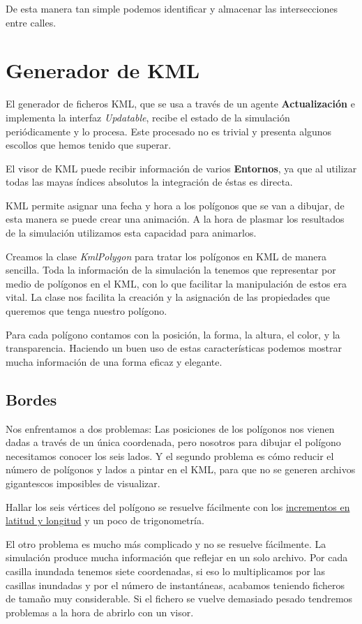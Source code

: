 De esta manera tan simple podemos identificar y almacenar las intersecciones
entre calles.

\section{Generador de KML}

El generador de ficheros KML, que se usa a través de un agente {\bf
Actualización} e implementa la interfaz {\em Updatable}, recibe el estado de la
simulación periódicamente y lo procesa. Este procesado no es trivial y presenta
algunos escollos que hemos tenido que superar.

El visor de KML puede recibir información de varios {\bf Entornos}, ya que al
utilizar todas las mayas índices absolutos la integración de éstas es directa.

KML permite asignar una fecha y hora a los polígonos que se van a dibujar, de
esta manera se puede crear una animación. A la hora de plasmar los resultados
de la simulación utilizamos esta capacidad para animarlos.

Creamos la clase {\em KmlPolygon} para tratar los polígonos en KML de manera
sencilla. Toda la información de la simulación la tenemos que representar por
medio de polígonos en el KML, con lo que facilitar la manipulación de estos era
vital. La clase nos facilita la creación y la asignación de las propiedades que
queremos que tenga nuestro polígono.

Para cada polígono contamos con la posición, la forma, la altura, el color, y la
transparencia. Haciendo un buen uso de estas características podemos mostrar
mucha información de una forma eficaz y elegante.

\subsection{Bordes}

Nos enfrentamos a dos problemas: Las posiciones de los polígonos nos vienen
dadas a través de un única coordenada, pero nosotros para dibujar el polígono
necesitamos conocer los seis lados. Y el segundo problema es cómo reducir el
número de polígonos y lados a pintar en el KML, para que no se generen archivos
gigantescos imposibles de visualizar.

Hallar los seis vértices del polígono se resuelve fácilmente con los
\hyperref[incrementos]{incrementos en latitud y longitud} y un poco de
trigonometría.

El otro problema es mucho más complicado y no se resuelve fácilmente. La
simulación produce mucha información que reflejar en un solo archivo. Por
cada casilla inundada tenemos siete coordenadas, si eso lo multiplicamos por las
casillas inundadas y por el número de instantáneas, acabamos teniendo ficheros
de tamaño muy considerable. Si el fichero se vuelve demasiado pesado tendremos
problemas a la hora de abrirlo con un visor.


